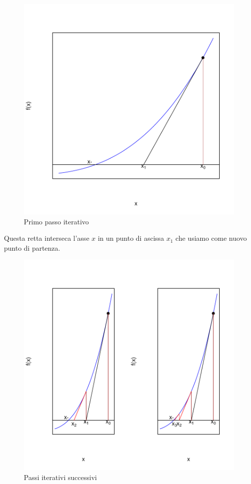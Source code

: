 \documentclass[onecolumn,11pt]{book}
\begin{document}
\begin{figure}
\begin{center}
\includegraphics{Rmatematica-step0}
\end{center}
\caption{Primo passo iterativo}
\label{fig:newton1}
\end{figure}
Questa retta interseca l'asse $x$ in un punto di ascissa $x_1$ che usiamo come nuovo punto di partenza.
\begin{figure}\begin{center}
\includegraphics{Rmatematica-step1}
\caption{Passi iterativi successivi}
\label{fig:newton2}
\end{center}
\end{figure}
\end{document}
